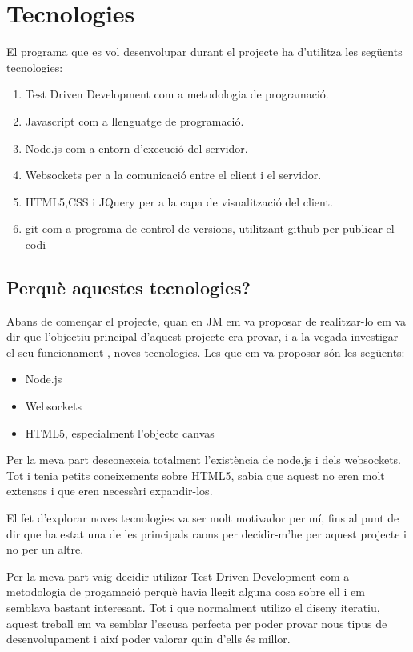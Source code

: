 \chapter{Tecnologies}
\label{sec:tecnologies}

El programa que es vol desenvolupar durant el projecte ha d'utilitza les següents tecnologies: 

\begin{enumerate}
	\item{Test Driven Development com a metodologia de programació.}
	\item{Javascript com a llenguatge de programació.}
	\item{Node.js com a entorn d'execució del servidor.}
	\item{Websockets per a la comunicació entre el client i el servidor.}
	\item{HTML5,CSS i JQuery per a la capa de visualització del client.}
	\item{git com a programa de control de versions, utilitzant github per publicar el codi}
\end{enumerate}

\section{Perquè aquestes tecnologies?}

Abans de començar el projecte, quan en JM em va proposar de realitzar-lo em va dir que l'objectiu principal d'aquest projecte era provar, i a la vegada investigar el seu funcionament , noves tecnologies. Les que em va proposar són les següents: 
\begin{itemize}
	\item{Node.js}
	\item{Websockets}
	\item{HTML5, especialment l'objecte canvas}
\end{itemize}

Per la meva part desconexeia totalment l'existència de node.js i dels websockets. Tot i tenia petits coneixements sobre HTML5, sabia que aquest no eren molt extensos i que eren necessàri expandir-los.

El fet d'explorar noves tecnologies va ser molt motivador per mí, fins al punt de dir que ha estat una de les principals raons per decidir-m'he per aquest projecte i no per un altre. 

Per la meva part vaig decidir utilizar Test Driven Development com a metodologia de progamació perquè havia llegit alguna cosa sobre ell i em semblava bastant interesant. Tot i que normalment utilizo el diseny iteratiu, aquest treball em va semblar l'escusa perfecta per poder provar nous tipus de desenvolupament i així poder valorar quin d'ells és millor. 

